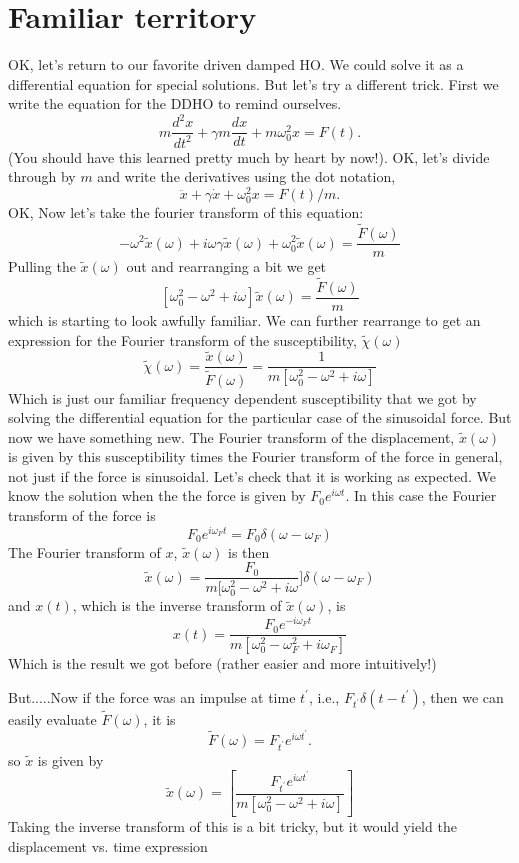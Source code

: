 \documentclass[]{revtex4}
\newcommand{\sm}[1]{{\[#1\]}}
\begin{document}
\section*{Familiar territory}
OK, let's return to our favorite driven damped HO.  We could solve it as a differential equation for special solutions. But let's try a different trick.
First we write the equation for the DDHO to remind ourselves.
\sm{m\frac{d^2x}{dt^2}+\gamma m \frac{dx}{dt} + m\omega_0^2 x = F(t).}
(You should have this learned pretty much by heart by now!).  OK, let's divide through by $m$ and write the derivatives using the dot notation,
\sm{\ddot{x}+\gamma  \dot{x} + \omega_0^2 x = F(t)/m.}
OK, Now let's take the fourier transform of this equation:
\sm{-\omega^2\tilde{x}(\omega) + i\omega\gamma\tilde{x}(\omega) + \omega_0^2\tilde{x}(\omega) = \frac{\tilde{F}(\omega)}{m}}
Pulling the $\tilde{x}(\omega)$ out and rearranging a bit we get
\sm{[\omega_0^2-\omega^2 + i\omega]\tilde{x}(\omega) = \frac{\tilde{F}(\omega)}{m}}
which is starting to look awfully familiar.   We can further rearrange to get an expression for the Fourier transform of the
susceptibility, $\tilde{\chi}(\omega)$
\sm{\tilde{\chi}(\omega)=\frac{\tilde{x}(\omega)}{\tilde{F}(\omega)}=\frac{1}{{m}\left[{\omega_0^2-\omega^2 + i\omega}\right]}}
Which is just our familiar frequency dependent susceptibility that we got by solving the differential equation for the particular
case of the sinusoidal force.  But now we have something new.  The Fourier transform of the displacement, $\tilde{x}(\omega)$ is given by this susceptibility
times the Fourier transform of the force in general, not just if the force is sinusoidal.  
Let's check that it is working as expected.  We know the solution when the the force
is given by $F_0e^{i\omega t}$.  In this case the Fourier transform of the force is
\sm{F_0e^{i\omega_F t} = F_0\delta (\omega-\omega_F)}
The Fourier transform of $x$, $\tilde{x} (\omega)$ is then
\sm{\tilde{x}(\omega)=\frac{F_0}{m[\omega_0^2-\omega^2 + i\omega}]\delta (\omega-\omega_F)}
and $x(t)$, which is the inverse transform of $\tilde{x}(\omega)$, is
\sm{{x}(t)=\frac{F_0e^{-i\omega_F t}}{m[\omega_0^2-\omega_F^2 + i\omega_F]}}
Which is the result we got before (rather easier and more intuitively!)

But.....Now if the force was an impulse at time $t^\prime$, i.e., $F_{t^\prime}\delta(t-t^\prime)$,
then we can easily evaluate $\tilde{F}(\omega)$, it is
\sm{\tilde{F}(\omega) =  F_{t^\prime}e^{i\omega t^\prime}.}
so $\tilde{x}$ is given by
\sm{\tilde{x}(\omega) = \left[\frac{F_{t^\prime} e^{i\omega t^\prime}}{m[\omega_0^2-\omega^2 + i\omega]}\right]}
Taking the inverse transform of this is a bit tricky, but it would yield the displacement vs. time expression
\end{document}
